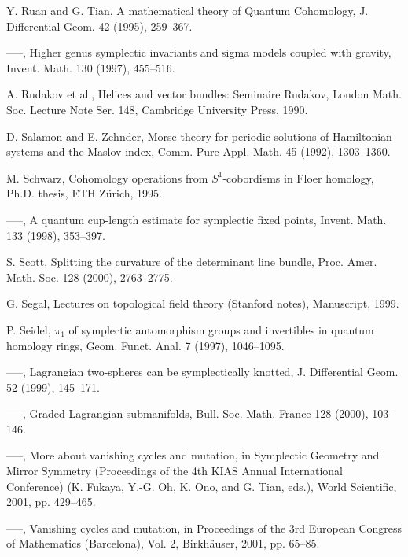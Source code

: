 \begin{list}{}{\setlength{\leftmargin}{3em}\setlength{\labelwidth}{2.5em}\setlength{\itemsep}{.5em}\small}
\item[\hypertarget{bib:115}{[115]}] Y. Ruan and G. Tian, A mathematical theory of Quantum Cohomology, J. Differential Geom. 42 (1995), 259–367. 
\item[\hypertarget{bib:116}{[116]}] —–, Higher genus symplectic invariants and sigma models coupled with gravity, Invent. Math. 130 (1997), 455–516. 
\item[\hypertarget{bib:117}{[117]}] A. Rudakov et al., Helices and vector bundles: Seminaire Rudakov, London Math. Soc. Lecture Note Ser. 148, Cambridge University Press, 1990. 
\item[\hypertarget{bib:118}{[118]}] D. Salamon and E. Zehnder, Morse theory for periodic solutions of Hamiltonian systems and the Maslov index, Comm. Pure Appl. Math. 45 (1992), 1303–1360. 
\item[\hypertarget{bib:119}{[119]}] M. Schwarz, Cohomology operations from $S^1$-cobordisms in Floer homology, Ph.D. thesis, ETH Zürich, 1995. 
\item[\hypertarget{bib:120}{[120]}] —–, A quantum cup-length estimate for symplectic fixed points, Invent. Math. 133 (1998), 353–397. 
\item[\hypertarget{bib:121}{[121]}] S. Scott, Splitting the curvature of the determinant line bundle, Proc. Amer. Math. Soc. 128 (2000), 2763–2775. 
\item[\hypertarget{bib:122}{[122]}] G. Segal, Lectures on topological field theory (Stanford notes), Manuscript, 1999. 
\item[\hypertarget{bib:123}{[123]}] P. Seidel, $\pi_1$ of symplectic automorphism groups and invertibles in quantum homology rings, Geom. Funct. Anal. 7 (1997), 1046–1095. 
\item[\hypertarget{bib:124}{[124]}] —–, Lagrangian two-spheres can be symplectically knotted, J. Differential Geom. 52 (1999), 145–171. 
\item[\hypertarget{bib:125}{[125]}] —–, Graded Lagrangian submanifolds, Bull. Soc. Math. France 128 (2000), 103–146. 
\item[\hypertarget{bib:126}{[126]}] —–, More about vanishing cycles and mutation, in Symplectic Geometry and Mirror Symmetry (Proceedings of the 4th KIAS Annual International Conference) (K. Fukaya, Y.-G. Oh, K. Ono, and G. Tian, eds.), World Scientific, 2001, pp. 429–465. 
\item[\hypertarget{bib:127}{[127]}] —–, Vanishing cycles and mutation, in Proceedings of the 3rd European Congress of Mathematics (Barcelona), Vol. 2, Birkhäuser, 2001, pp. 65–85. 

\end{list}
